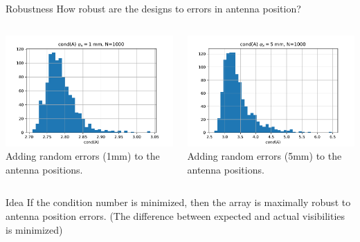 \documentclass[ignorenonframetext]{beamer}
\begin{document}
\begin{frame}{Robustness}
How robust are the designs to errors in antenna position?
 \begin{columns}
  \begin{column}{0.5\linewidth}
  \includegraphics[width=\linewidth]{fig/cond_histogram.pdf}
  Adding random errors (1mm) to the antenna positions.
  \end{column}
  \begin{column}{0.5\linewidth}
  \includegraphics[width=\linewidth]{fig/cond_histogram5.pdf}   
  Adding random errors (5mm) to the antenna positions.
  \end{column}
 \end{columns}
 \begin{block}{Idea}
  If the condition number is minimized, then the array is maximally robust to antenna position errors. (The difference between expected and actual visibilities is minimized)
 \end{block}

\end{frame}
\end{document}
